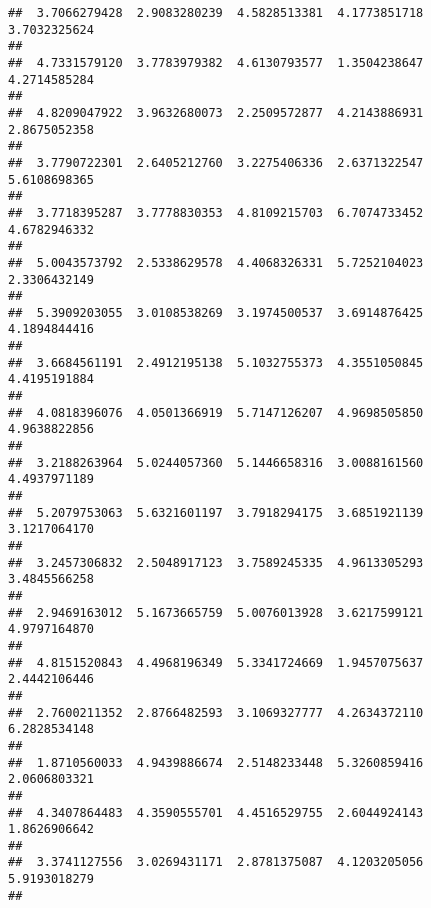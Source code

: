 \documentclass[]{article}
\begin{document}
\begin{verbatim}
##  3.7066279428  2.9083280239  4.5828513381  4.1773851718  3.7032325624 
##                                                                       
##  4.7331579120  3.7783979382  4.6130793577  1.3504238647  4.2714585284 
##                                                                       
##  4.8209047922  3.9632680073  2.2509572877  4.2143886931  2.8675052358 
##                                                                       
##  3.7790722301  2.6405212760  3.2275406336  2.6371322547  5.6108698365 
##                                                                       
##  3.7718395287  3.7778830353  4.8109215703  6.7074733452  4.6782946332 
##                                                                       
##  5.0043573792  2.5338629578  4.4068326331  5.7252104023  2.3306432149 
##                                                                       
##  5.3909203055  3.0108538269  3.1974500537  3.6914876425  4.1894844416 
##                                                                       
##  3.6684561191  2.4912195138  5.1032755373  4.3551050845  4.4195191884 
##                                                                       
##  4.0818396076  4.0501366919  5.7147126207  4.9698505850  4.9638822856 
##                                                                       
##  3.2188263964  5.0244057360  5.1446658316  3.0088161560  4.4937971189 
##                                                                       
##  5.2079753063  5.6321601197  3.7918294175  3.6851921139  3.1217064170 
##                                                                       
##  3.2457306832  2.5048917123  3.7589245335  4.9613305293  3.4845566258 
##                                                                       
##  2.9469163012  5.1673665759  5.0076013928  3.6217599121  4.9797164870 
##                                                                       
##  4.8151520843  4.4968196349  5.3341724669  1.9457075637  2.4442106446 
##                                                                       
##  2.7600211352  2.8766482593  3.1069327777  4.2634372110  6.2828534148 
##                                                                       
##  1.8710560033  4.9439886674  2.5148233448  5.3260859416  2.0606803321 
##                                                                       
##  4.3407864483  4.3590555701  4.4516529755  2.6044924143  1.8626906642 
##                                                                       
##  3.3741127556  3.0269431171  2.8781375087  4.1203205056  5.9193018279 
##                                                                       

\end{verbatim}
\end{document}
